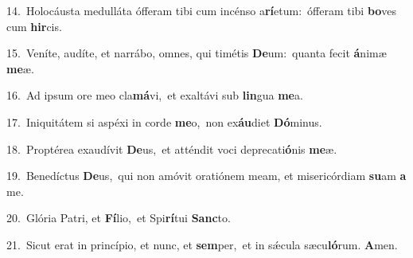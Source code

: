 {\numbfont\textcolor{\numbcolor}{14.}}~Holocáusta medulláta ófferam tibi cum incénso a\-\textbf{rí}\-etum:~\star ófferam tibi \textbf{bo}\-ves cum \textbf{hir}\-cis.\par
{\numbfont\textcolor{\numbcolor}{15.}}~Veníte, audíte, et narrábo, omnes, qui timétis \textbf{De}\-um:~\star quanta fecit \textbf{á}\-nimæ \textbf{me}\-æ.\par
{\numbfont\textcolor{\numbcolor}{16.}}~Ad ipsum ore meo cla\-\textbf{má}\-vi,~\star et exaltávi sub \textbf{lin}\-gua \textbf{me}\-a.\par
{\numbfont\textcolor{\numbcolor}{17.}}~Iniquitátem si aspéxi in corde \textbf{me}\-o,~\star non ex\-\textbf{áu}\-diet \textbf{Dó}\-minus.\par
{\numbfont\textcolor{\numbcolor}{18.}}~Proptérea exaudívit \textbf{De}\-us,~\star et atténdit voci deprecati\-\textbf{ó}\-nis \textbf{me}\-æ.\par
{\numbfont\textcolor{\numbcolor}{19.}}~Benedíctus \textbf{De}\-us,~\star qui non amóvit oratiónem meam, et misericórdiam \textbf{su}\-am \textbf{a} me.\par
{\numbfont\textcolor{\numbcolor}{20.}}~Glória Patri, et \textbf{Fí}\-lio,~\star et Spi\-\textbf{rí}\-tui \textbf{Sanc}\-to.\par
{\numbfont\textcolor{\numbcolor}{21.}}~Sicut erat in princípio, et nunc, et \textbf{sem}\-per,~\star et in sǽcula sæcu\-\textbf{ló}\-rum. \textbf{A}\-men.\par
